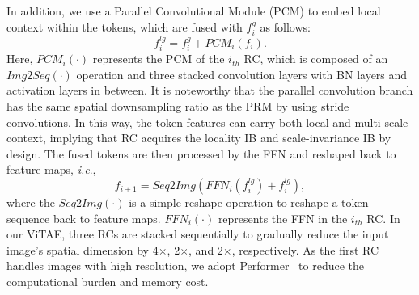 \documentclass[twocolumn]{svjour3}          \smartqed  \usepackage{natbib}
\newcommand{\ie}{i.e}
\def\onedot{.\xspace}
\def\ie{\emph{i.e}\onedot}
\begin{document}
In addition, we use a Parallel Convolutional Module (PCM) to embed local context within the tokens, which are fused with $f_i^{g}$ as follows:
\begin{equation}
    f_i^{lg} = f_i^{g} + PCM_i(f_i).
\end{equation}
Here, $PCM_i(\cdot)$ represents the PCM of the $i_{th}$ RC, which is composed of an $Img2Seq(\cdot)$ operation and three stacked convolution layers with BN layers and activation layers in between. It is noteworthy that the parallel convolution branch has the same spatial downsampling ratio as the PRM by using stride convolutions. In this way, the token features can carry both local and multi-scale context, implying that RC acquires the locality IB and scale-invariance IB by design. The fused tokens are then processed by the FFN and reshaped back to feature maps, \ie,
\begin{equation}
\label{eq:residual ffn}
    f_{i+1} = Seq2Img(FFN_i(f_i^{lg}) + f_i^{lg}),
\end{equation}
where the $Seq2Img(\cdot)$ is a simple reshape operation to reshape a token sequence back to feature maps. $FFN_i(\cdot)$ represents the FFN in the $i_{th}$ RC. In our ViTAE, three RCs are stacked sequentially to gradually reduce the input image's spatial dimension by 4$\times$, 2$\times$, and 2$\times$, respectively. As the first RC handles images with high resolution, we adopt Performer~\citep{choromanski2020rethinking} to reduce the computational burden and memory cost.
\end{document}
